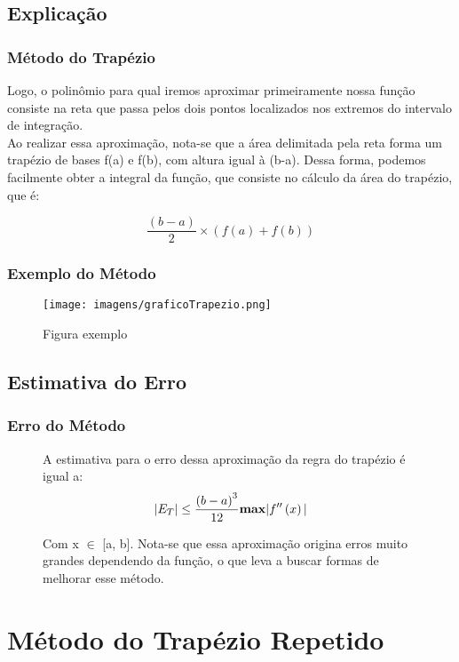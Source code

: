 \documentclass{beamer}
\begin{document}
\subsection{Explicação}
\begin{frame}
\frametitle{Método do Trapézio}
	Logo, o polinômio para qual iremos aproximar primeiramente nossa função consiste na reta que passa pelos dois pontos localizados nos extremos do intervalo de integração. \\ 
	
	Ao realizar essa aproximação, nota-se que a área delimitada pela reta forma um trapézio de bases f(a) e f(b), com altura igual à (b-a). Dessa forma, podemos facilmente obter a integral da função, que consiste no cálculo da área do trapézio, que é:

	\begin{equation}
		\frac{\left(b-a\right)}{2} \times \left(f\left(a\right) + f\left(b\right) \right)
	\end{equation}
\end{frame}

\begin{frame}
	\frametitle{Exemplo do Método}
	\begin{figure}
		\caption{Figura exemplo}
		\centering
		\texttt{[image: imagens/graficoTrapezio.png]}
	\end{figure}
\end{frame}

\subsection{Estimativa do Erro}
\begin{frame}
\frametitle{Erro do Método}
\begin{figure}
	A estimativa para o erro dessa aproximação da regra do trapézio é igual a:
	\begin{equation}
		\vert E_{T} \vert \le \frac{\left(b-a\right)^3}{12} \textrm{\textbf{max}}\vert f''\left(x\right) \vert
	\end{equation}
	
	Com x $\in$ [a, b]. Nota-se que essa aproximação origina erros muito grandes dependendo da função, o que leva a buscar formas de melhorar esse método.
\end{figure}
\end{frame}


\section{Método do Trapézio Repetido}
\end{document}
